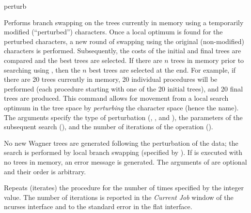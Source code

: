 	 
\begin{command}{perturb}{}


	\begin{poydescription} 
        Performs branch swapping on the trees currently in memory using a temporarily modified 
        (``perturbed'') characters. Once a local optimum is found for 
        the perturbed characters,
        a new round of swapping using the original (non-modified) characters is
        performed. Subsequently, the costs of the initial and final trees are
        compared and the best trees are selected. If there are $n$ trees in
        memory prior to searching using , then the  $n$ best
        trees are selected at the end. For example, if there are 20 trees currently in memory,
        20 individual  procedures will be performed (each
        procedure starting with one of the 20 initial trees), and 20
        final trees are produced.        
        This command allows for movement from a local search optimum in the tree space by
        \emph{perturbing} the character space (hence the name). The
        arguments specify the type of perturbation (,
        , and ), the parameters of the
        subsequent search (), and the number of iterations 
        of the  operation ().
        
        No new Wagner trees are generated following the perturbation of the
        data; the search is performed by local branch swapping (specified by
        ). If  is executed with no
        trees in memory, an error message is generated. The arguments of
         are optional and their order is arbitrary. 
 	\end{poydescription}

	\begin{arguments}

            {Repeats (iterates) the  procedure for the
            number of times specified by the integer value. The number of iterations
            is reported in the \emph{Current Job} window of the ncurses interface
            and to the standard error in the flat interface.}
            {}


\end{arguments}
\end{command}
